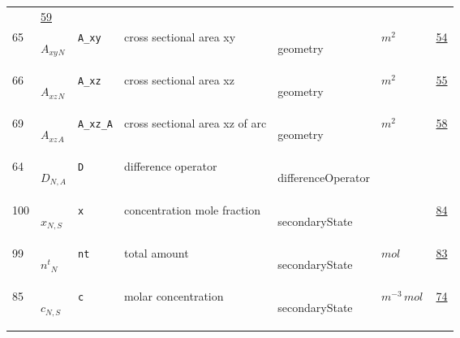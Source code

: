 \begin{longtable}{|p{1cm}|p{2.5cm}|p{4.5cm}|p{8cm}|p{3.0cm}|p{3cm}|p{1cm}|}
             &                 \hyperlink{"e:59"}{ 59 }
                 \\
            65
             & \hypertarget{"v:65"}{ $ {{A_{xy}}}{_{N}} $}
             & \verb|A_xy|
             & cross sectional area xy
             & \begin{lay}geometry \end{lay}
             & $ m^{2} \, $
             &                 \hyperlink{"e:54"}{ 54 }
                 \\
            66
             & \hypertarget{"v:66"}{ $ {{A_{xz}}}{_{N}} $}
             & \verb|A_xz|
             & cross sectional area xz
             & \begin{lay}geometry \end{lay}
             & $ m^{2} \, $
             &                 \hyperlink{"e:55"}{ 55 }
                 \\
            69
             & \hypertarget{"v:69"}{ $ {{A_{xz}}}{_{A}} $}
             & \verb|A_xz_A|
             & cross sectional area xz of arc
             & \begin{lay}geometry \end{lay}
             & $ m^{2} \, $
             &                 \hyperlink{"e:58"}{ 58 }
                 \\
            64
             & \hypertarget{"v:64"}{ $ {D}{_{N, A}} $}
             & \verb|D|
             & difference operator
             & \begin{lay}differenceOperator \end{lay}
             & $  $
             & \\
            100
             & \hypertarget{"v:100"}{ $ {x}{_{N, S}} $}
             & \verb|x|
             & concentration mole fraction
             & \begin{lay}secondaryState \end{lay}
             & $  $
             &                 \hyperlink{"e:84"}{ 84 }
                 \\
            99
             & \hypertarget{"v:99"}{ $ {{n^t}}{_{N}} $}
             & \verb|nt|
             & total amount
             & \begin{lay}secondaryState \end{lay}
             & $ mol \, $
             &                 \hyperlink{"e:83"}{ 83 }
                 \\
            85
             & \hypertarget{"v:85"}{ $ {c}{_{N, S}} $}
             & \verb|c|
             & molar concentration
             & \begin{lay}secondaryState \end{lay}
             & $ m^{-3} \,mol \, $
             &                 \hyperlink{"e:74"}{ 74 }
                 \\
    \end{longtable}